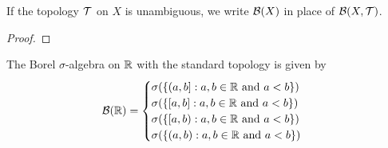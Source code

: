 \documentclass{book}
\begin{document}
	\begin{note}
		If the topology $\mathcal{T}$ on $X$ is unambiguous, we write $\mathcal{B}(X)$ in place of $\mathcal{B}(X, \mathcal{T})$.
	\end{note}

	\begin{ex}  
		\tcr{Show that $\MB(\ol{\R}) = \sig((\al, \infty]: \al \in \R)$ and similar}
	\end{ex}

	\begin{proof}
	\end{proof}
	
	\begin{ex}  
		The Borel $\sigma$-algebra on $\mathbb{R}$ with the standard topology is given by 
		\[
		\mathcal{B}(\mathbb{R}) =
		\begin{cases}
			\sigma(\{(a,b]:a,b \in \mathbb{R} \text{ and } a<b\}) \\
			\sigma(\{[a,b]:a,b \in \mathbb{R} \text{ and } a<b\}) \\
			\sigma(\{[a,b):a,b \in \mathbb{R} \text{ and } a<b\}) \\
			\sigma(\{(a,b):a,b \in \mathbb{R} \text{ and } a<b\}) \\
		\end{cases}
		\]
	\end{ex}
	
\end{document}

